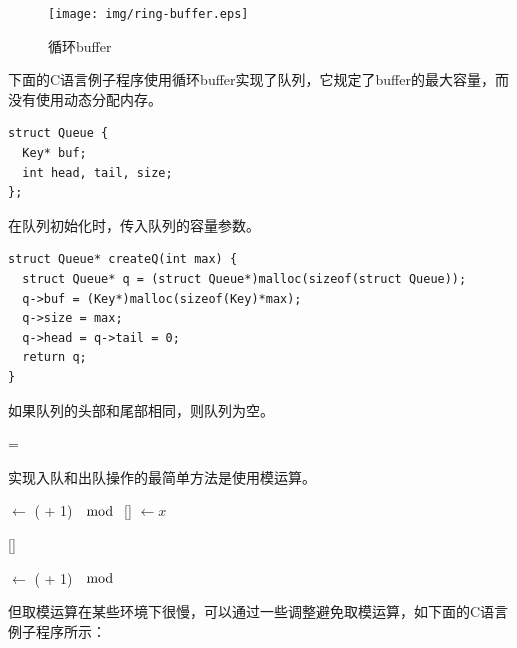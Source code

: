\documentclass[UTF8]{article}
\begin{document}
\begin{figure}[htbp]
 \centering
 \texttt{[image: img/ring-buffer.eps]}
 \caption{循环buffer} \label{fig:circular-buffer}
\end{figure}

下面的C语言例子程序使用循环buffer实现了队列，它规定了buffer的最大容量，而没有使用动态分配内存。

\lstset{language=C}
\begin{lstlisting}
struct Queue {
  Key* buf;
  int head, tail, size;
};
\end{lstlisting}

在队列初始化时，传入队列的容量参数。

\begin{lstlisting}
struct Queue* createQ(int max) {
  struct Queue* q = (struct Queue*)malloc(sizeof(struct Queue));
  q->buf = (Key*)malloc(sizeof(Key)*max);
  q->size = max;
  q->head = q->tail = 0;
  return q;
}
\end{lstlisting}

如果队列的头部和尾部相同，则队列为空。

\begin{algorithmic}
  \State \Return {} = 
\EndFunction
\end{algorithmic}

实现入队和出队操作的最简单方法是使用模运算。

\begin{algorithmic}
    \State {} $\gets $ ( + 1) $\mod$ 
    \State {}[] $\gets x$
  \EndIf
\EndFunction
\end{algorithmic}

\begin{algorithmic}
    \State \Return {}[]
  \EndIf
\EndFunction
\end{algorithmic}

\begin{algorithmic}
    \State {} $\gets $ ( + 1) $\mod$ 
  \EndIf
\EndFunction
\end{algorithmic}

但取模运算在某些环境下很慢，可以通过一些调整避免取模运算，如下面的C语言例子程序所示：
\end{document}
